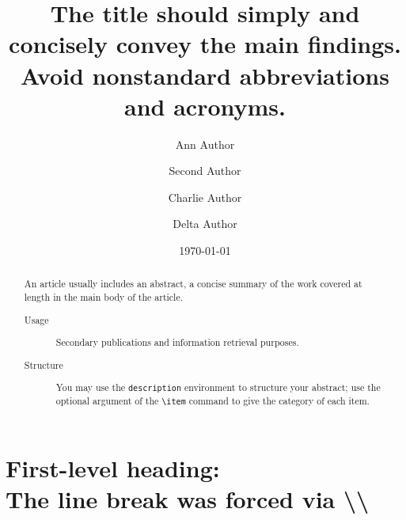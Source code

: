 \documentclass[%
 preprint, linenumbers,
 amsmath,amssymb,
 aps, physrev,
pra,
]{revtex4-2}
\begin{document}

\title{\textbf{The title should simply and concisely convey the main findings. Avoid nonstandard abbreviations and acronyms.} 
}%


\author{Ann Author}
\author{Second Author}%
%


\author{Charlie Author}
%
%
\author{Delta Author}
%


\date{\today}%

\begin{abstract}
An article usually includes an abstract, a concise summary of the work
covered at length in the main body of the article. 
\begin{description}
\item[Usage]
Secondary publications and information retrieval purposes.
\item[Structure]
You may use the \texttt{description} environment to structure your abstract;
use the optional argument of the \verb+\item+ command to give the category of each item. 
\end{description}
\end{abstract}

\maketitle


\section{\label{sec:level1}First-level heading:\protect\\ The line
break was forced \lowercase{via} \textbackslash\textbackslash}
\end{document}
